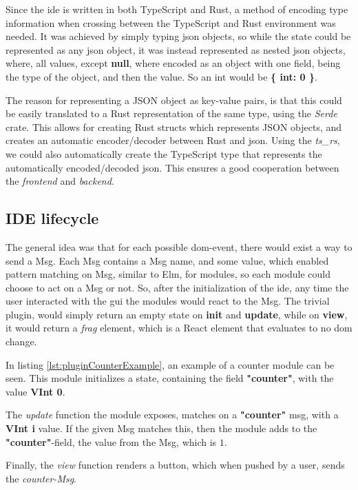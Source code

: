 Since the \gls{ide} is written in both TypeScript and Rust, a method of encoding
type information when crossing between the TypeScript and Rust environment was
needed. It was achieved by simply typing \gls{json} objects, so while the state
could be represented as any \gls{json} object, it was instead represented as
nested \gls{json} objects, where, all values, except \textbf{null}, where
encoded as an object with one field, being the type of the object, and then the
value. So an int would be \textbf{\{ int: 0 \}}.

The reason for representing a JSON object as key-value pairs, is that this could
be easily translated to a Rust representation of the same type, using the
\textit{Serde} crate. This allows for creating Rust structs which represents
JSON objects, and creates an automatic encoder/decoder between Rust and
\gls{json}. Using the \textit{ts\_rs}, we could also automatically create the
TypeScript type that represents the automatically encoded/decoded \gls{json}.
This ensures a good cooperation between the \textit{frontend} and
\textit{backend}.

\subsection{IDE lifecycle}

The general idea was that for each possible \gls{dom}-event, there would exist a
way to send a Msg. Each Msg contains a Msg name, and some value, which enabled
pattern matching on Msg, similar to Elm, for modules, so each module could
choose to act on a Msg or not. So, after the initialization of the \gls{ide},
any time the user interacted with the \gls{gui} the modules would react to the
Msg. The trivial plugin, would simply return an empty state on \textbf{init} and
\textbf{update}, while on \textbf{view}, it would return a \textit{frag}
element, which is a React element that evaluates to no \gls{dom} change.

In listing \ref{lst:pluginCounterExample}, an example of a counter module can be
seen. This module initializes a state, containing the field \textbf{"counter"},
with the value \textbf{VInt 0}.

The \textit{update} function the module exposes, matches on a \textbf{"counter"}
msg, with a \textbf{VInt i} value. If the given Msg matches this, then the
module adds to the \textbf{"counter"}-field, the value from the Msg, which is
$1$.

Finally, the \textit{view} function renders a button, which when pushed by a
user, sends the \textit{counter-Msg}.

